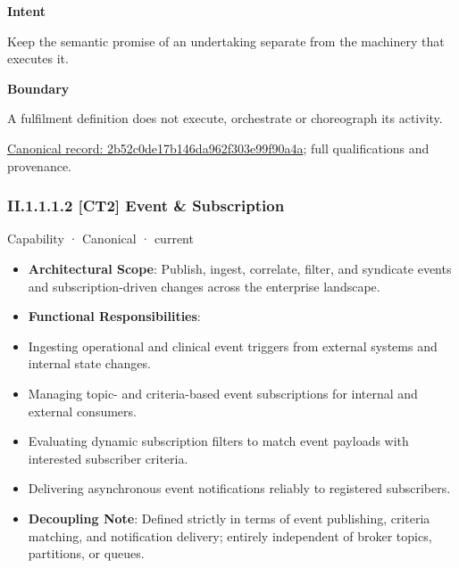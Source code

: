 \textbf{Intent}



Keep the semantic promise of an undertaking separate from the machinery that executes it.



\textbf{Boundary}



A fulfilment definition does not execute, orchestrate or choreograph its activity.


{\footnotesize \href{../../../../../../../continuum/strategy/capability/2b52c0de17b146da962f303e99f90a4a.md}{Canonical record: 2b52c0de17b146da962f303e99f90a4a}; full qualifications and provenance.}\par
\subsubsection*{II.1.1.1.2 [CT2] Event \& Subscription}
\label{navigation:II.1.1.1.2}

\label{element:b768b129971e4bf5bccc03d33d2fcb4e}
{\small Capability · Canonical · current}\par

\begin{itemize}


\item \textbf{Architectural Scope}: Publish, ingest, correlate, filter, and syndicate events and subscription-driven changes across the enterprise landscape.

\item \textbf{Functional Responsibilities}:

\item Ingesting operational and clinical event triggers from external systems and internal state changes.

\item Managing topic- and criteria-based event subscriptions for internal and external consumers.

\item Evaluating dynamic subscription filters to match event payloads with interested subscriber criteria.

\item Delivering asynchronous event notifications reliably to registered subscribers.

\item \textbf{Decoupling Note}: Defined strictly in terms of event publishing, criteria matching, and notification delivery; entirely independent of broker topics, partitions, or queues.

\end{itemize}



